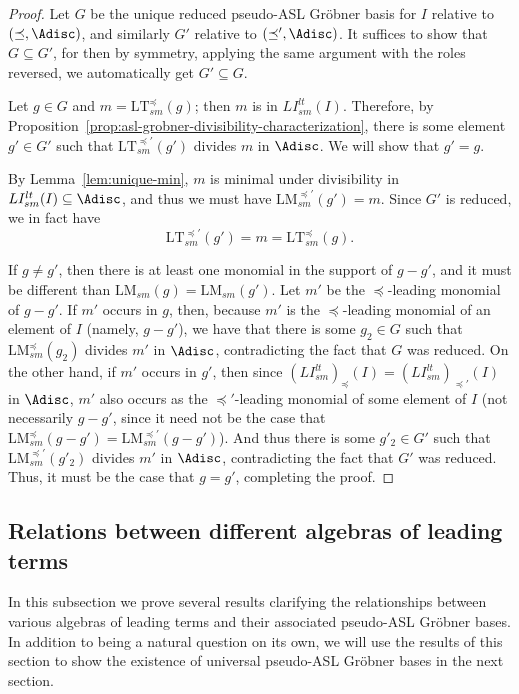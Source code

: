 \documentclass[11pt,reqno]{amsart}
\newcommand{\lmsm}{\text{LM}_{sm}}
\newcommand{\ltsm}{\text{LT}_{sm}}
\newcommand{\lismlt}{LI_{sm}^{lt}}
\theoremstyle{definition}
\numberwithin{equation}{section}
\begin{document}
\begin{proof}
Let $G$ be the unique reduced pseudo-ASL Gröbner basis for $I$ relative to $(\preceq, \Adisc)$, and similarly $G'$ relative to $(\preceq', \Adisc)$. It suffices to show that $G \subseteq G'$, for then by symmetry, applying the same argument with the roles reversed, we automatically get $G' \subseteq G$.

Let $g \in G$ and $m = \ltsm^{\preceq}(g)$; then $m$ is in $\lismlt(I)$.  Therefore, by Proposition~\ref{prop:asl-grobner-divisibility-characterization}, there is some element $g' \in G'$ such that $\ltsm^{\preceq'}(g')$ divides $m$ in $\Adisc$. We will show that $g' = g$. 

By Lemma~\ref{lem:unique-min}, $m$ is minimal under divisibility in $\lismlt(I) \subseteq \Adisc$, and thus we must have $\lmsm^{\preceq'}(g') = m$. Since $G'$ is reduced, we in fact have 
\[
\ltsm^{\preceq'}(g') = m = \ltsm^{\preceq}(g).
\] 

If $g \neq g'$, then there is at least one monomial in the support of $g-g'$, and it must be different than $\lmsm(g) = \lmsm(g')$. Let $m'$ be the $\preceq$-leading monomial of $g-g'$. If $m'$ occurs in $g$, then, because $m'$ is the $\preceq$-leading monomial of an element of $I$ (namely, $g-g'$), we have that there is some $g_2 \in G$ such that $\lmsm^{\preceq}(g_2)$ divides $m'$ in $\Adisc$, contradicting the fact that $G$ was reduced. On the other hand, if $m'$ occurs in $g'$, then since $(\lismlt)_{\preceq}(I) = (\lismlt)_{\preceq'}(I)$ in $\Adisc$, $m'$ also occurs as the $\preceq'$-leading monomial of some element of $I$ (not necessarily $g-g'$, since it need not be the case that $\lmsm^{\preceq}(g-g') = \lmsm^{\preceq'}(g-g')$). And thus there is some $g'_2 \in G'$ such that $\lmsm^{\preceq'}(g'_2)$ divides $m'$ in $\Adisc$, contradicting the fact that $G'$ was reduced. Thus, it must be the case that $g=g'$, completing the proof.
\end{proof}

\subsection{Relations between different algebras of leading terms}
In this subsection we prove several results clarifying the relationships between various algebras of leading terms and their associated pseudo-ASL Gröbner bases. In addition to being a natural question on its own, we will use the results of this section to show the existence of universal pseudo-ASL Gröbner bases in the next section.
\end{document}
